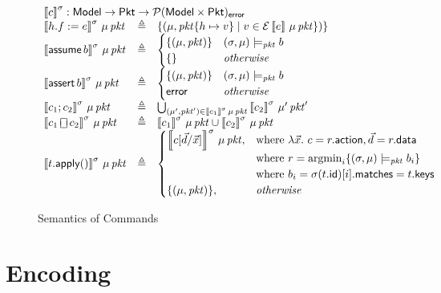 \documentclass{article}
\newcommand{\pkt}{\mathit{pkt}}
\newcommand{\error}{\mathsf{error}}
\newcommand{\denote}[1]{\left\llbracket#1\right\rrbracket}
\newcommand{\edenote}[1]{\mathcal{E}\denote{#1}}
\newcommand{\Pkt}{\mathsf{Pkt}}
\newcommand{\Model}{\mathsf{Model}}
\newcommand{\Row}{\mathsf{Row}}
\newcommand{\matches}{\mathsf{matches}}
\newcommand{\action}{\mathsf{action}}
\newcommand{\keys}{\mathsf{keys}}
\newcommand{\data}{\mathsf{data}}
\newcommand{\id}{\mathsf{id}}
\newcommand{\assert}{\mathop{\mathsf{assert}}}
\newcommand{\assume}{\mathop{\mathsf{assume}}}
\newcommand{\apply}{\mathsf{apply}}
\newcommand{\choiceop}{\rotatebox[origin=c]{90}{$\sqsubset\!\!\!\sqsupset$}}
\newcommand{\choice}{\mathbin{\choiceop}}
\newcommand{\havoc}[1]{\mathop{\textsf{havoc}}#1}
\newcommand{\argmin}{\mathop{\textrm{argmin}}}
\newcommand{\satisfy}[3]{({#1,#3}) \models_{#2}}
\begin{document}
\begin{figure}[htp]
  \[\begin{array}{l >{\triangleq}cl}
  \multicolumn{3}{l}{\denote{c}^\sigma : \Model \to \Pkt \to \mathcal{P}(\Model \times \Pkt)_\error }\\
    \denote{h.f := e}^\sigma\,\mu\,\pkt && \{(\mu, \pkt\{h \mapsto v\} \mid v \in \edenote{e}\,\mu\,\pkt\})\} \\
    \denote{\assume b}^\sigma\,\mu\,\pkt &&
    \begin{cases}
      \{(\mu,\pkt)\} & \satisfy \sigma \pkt \mu b \\
      \{\} & \textit{otherwise} \\
    \end{cases}\\
    \denote{\assert b}^\sigma\,\mu\,\pkt &&
    \begin{cases}
      \{(\mu,\pkt)\} & \satisfy \sigma \pkt \mu b \\
      \error & \textit{otherwise}
    \end{cases} \\
    \denote{c_1;c_2}^\sigma\,\mu\,\pkt&&
    \bigcup_{(\mu',\pkt') \in \denote{c_1}^\sigma\,\mu\,\pkt}\denote{c_2}^\sigma\,\mu'\,\pkt' \\
    \denote{c_1 \choice c_2}^\sigma\,\mu\,\pkt &&
    \denote{c_1}^\sigma\,\mu\,\pkt \cup \denote{c_2}^\sigma\,\mu\,\pkt \\
    \denote{t.\apply()}^\sigma\,\mu\,\pkt &&
    \begin{cases}
      \denote{c[\vec d/\vec x]}^\sigma\,\mu\,\pkt,
      & \text{where}~\lambda \vec x.~c = r.\action, \vec d = r.\data \\
      & \text{where}~r = \argmin_i\{\satisfy \sigma \pkt \mu b_i\} \\
      & \text{where}~b_i = \sigma(t.\id)[i].\matches = t.\keys \\
      \{(\mu,\pkt)\}, & \mathit{otherwise}
    \end{cases}
  \end{array}\]
  \caption{Semantics of Commands}
  \label{fig:com-sem}
\end{figure}

\section{Encoding}
\end{document}
